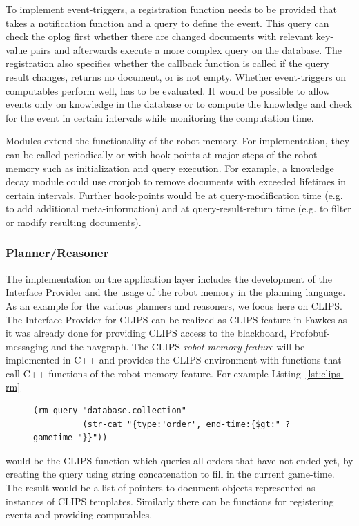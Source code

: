 \documentclass[a4paper,11pt]{article}
\newcommand{\reflst}[1]{Listing~\ref{#1}}
\begin{document}
To implement event-triggers, a registration function needs to be
provided that takes a notification function and a query to define the
event. This query can check the oplog first whether there are changed
documents with relevant key-value pairs and afterwards execute a more
complex query on the database. The registration also specifies whether
the callback function is called if the query result changes, returns
no document, or is not empty. Whether event-triggers on computables
perform well, has to be evaluated. It would be possible to allow
events only on knowledge in the database or to compute the knowledge
and check for the event in certain intervals while monitoring the
computation time.

Modules extend the functionality of the robot memory. For
implementation, they can be called periodically or with hook-points at
major steps of the robot memory such as initialization and query
execution. For example, a knowledge decay module could use cronjob to
remove documents with exceeded lifetimes in certain intervals. Further
hook-points would be at query-modification time (e.g. to add
additional meta-information) and at query-result-return time (e.g. to
filter or modify resulting documents).

\subsubsection{Planner/Reasoner}
\label{sec:impl-planner}
The implementation on the application layer includes the development
of the Interface Provider and the usage of the robot memory in the
planning language. As an example for the various planners and
reasoners, we focus here on CLIPS. The Interface Provider for CLIPS
can be realized as CLIPS-feature in Fawkes as it was already done for
providing CLIPS access to the blackboard, Profobuf-messaging and the
navgraph. The CLIPS \emph{robot-memory feature} will be implemented in C++
and provides the CLIPS environment with functions that call C++
functions of the robot-memory feature. For example \reflst{lst:clips-rm}
\begin{figure}
  \begin{lstlisting}[showlines,style=ReallySmallCLIPS, caption={CLIPS function to execute a query},
  label=lst:clips-rm,
  emph={skill, args, state, target, res},
  emphstyle=\bfseries\color{green!80!black},
  emph={[2]\?skill, \$\?args, wait-for-lock, \?target, use,
  WAIT-FOR-LOCK, SKILL-EXECUTION, running},
  emphstyle={[2]\bfseries\color{blue!80!black}},
  morekeywords={retract, assert, modify, skill-call, skill-to-execute,
    wait-for-lock}]
(rm-query "database.collection"
          (str-cat "{type:'order', end-time:{$gt:" ?gametime "}}"))
\end{lstlisting} %
\end{figure}
would be the CLIPS function which queries all orders that have not
ended yet, by creating the query using string concatenation to fill in
the current game-time. The result would be a list of pointers to document
objects represented as instances of CLIPS templates. Similarly there
can be functions for registering events and providing computables.
\end{document}
